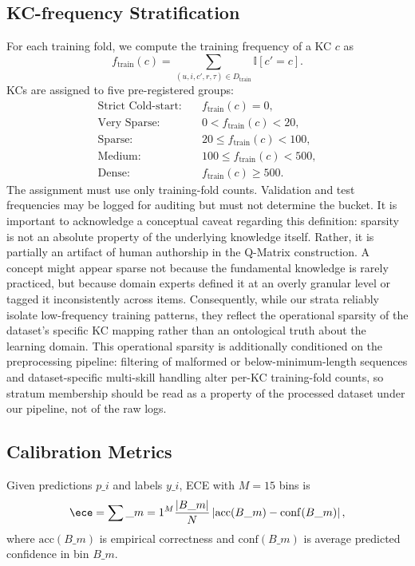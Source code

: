 \subsection{KC-frequency Stratification}
\label{sec:kc-strat}
For each training fold, we compute the training frequency of a KC $c$ as
\begin{equation}
f_{\mathrm{train}}(c)=\sum_{(u,i,c',r,\tau)\in D_{\mathrm{train}}}\mathbb{I}[c'=c].
\end{equation}
KCs are assigned to five pre-registered groups:
\begin{align}
\text{Strict Cold-start:} &\quad f_{\mathrm{train}}(c) = 0,\\
\text{Very Sparse:} &\quad 0 < f_{\mathrm{train}}(c) < 20,\\
\text{Sparse:} &\quad 20 \le f_{\mathrm{train}}(c) < 100,\\
\text{Medium:} &\quad 100 \le f_{\mathrm{train}}(c) < 500,\\
\text{Dense:} &\quad f_{\mathrm{train}}(c) \ge 500.
\end{align}
The assignment must use only training-fold counts. Validation and test frequencies may be logged for auditing but must not determine the bucket. It is important to acknowledge a conceptual caveat regarding this definition: sparsity is not an absolute property of the underlying knowledge itself. Rather, it is partially an artifact of human authorship in the Q-Matrix construction. A concept might appear sparse not because the fundamental knowledge is rarely practiced, but because domain experts defined it at an overly granular level or tagged it inconsistently across items. Consequently, while our strata reliably isolate low-frequency training patterns, they reflect the operational sparsity of the dataset's specific KC mapping rather than an ontological truth about the learning domain. This operational sparsity is additionally conditioned on the preprocessing pipeline: filtering of malformed or below-minimum-length sequences and dataset-specific multi-skill handling alter per-KC training-fold counts, so stratum membership should be read as a property of the processed dataset under our pipeline, not of the raw logs.

\subsection{Calibration Metrics}
Given predictions $p\_i$ and labels $y\_i$, ECE with $M=15$ bins is
\begin{equation}
\ece = \sum\_{m=1}^{M}\frac{|B\_m|}{N}\left|\mathrm{acc}(B\_m)-\mathrm{conf}(B\_m)\right|,
\end{equation}
where $\mathrm{acc}(B\_m)$ is empirical correctness and $\mathrm{conf}(B\_m)$ is average predicted confidence in bin $B\_m$.

